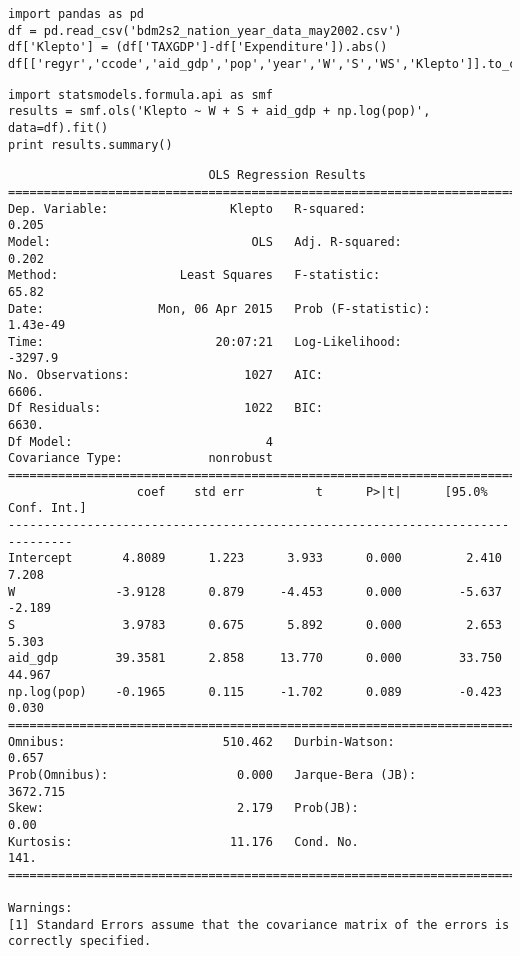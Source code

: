\documentclass[12pt,fleqn]{article}\usepackage{common}
\begin{document}
\begin{verbatim}
import pandas as pd
df = pd.read_csv('bdm2s2_nation_year_data_may2002.csv')
df['Klepto'] = (df['TAXGDP']-df['Expenditure']).abs()
df[['regyr','ccode','aid_gdp','pop','year','W','S','WS','Klepto']].to_csv('/tmp/out.csv')
\end{verbatim}

\begin{verbatim}
import statsmodels.formula.api as smf
results = smf.ols('Klepto ~ W + S + aid_gdp + np.log(pop)', data=df).fit()
print results.summary()
\end{verbatim}

\begin{verbatim}
                            OLS Regression Results                            
==============================================================================
Dep. Variable:                 Klepto   R-squared:                       0.205
Model:                            OLS   Adj. R-squared:                  0.202
Method:                 Least Squares   F-statistic:                     65.82
Date:                Mon, 06 Apr 2015   Prob (F-statistic):           1.43e-49
Time:                        20:07:21   Log-Likelihood:                -3297.9
No. Observations:                1027   AIC:                             6606.
Df Residuals:                    1022   BIC:                             6630.
Df Model:                           4                                         
Covariance Type:            nonrobust                                         
===============================================================================
                  coef    std err          t      P>|t|      [95.0% Conf. Int.]
-------------------------------------------------------------------------------
Intercept       4.8089      1.223      3.933      0.000         2.410     7.208
W              -3.9128      0.879     -4.453      0.000        -5.637    -2.189
S               3.9783      0.675      5.892      0.000         2.653     5.303
aid_gdp        39.3581      2.858     13.770      0.000        33.750    44.967
np.log(pop)    -0.1965      0.115     -1.702      0.089        -0.423     0.030
==============================================================================
Omnibus:                      510.462   Durbin-Watson:                   0.657
Prob(Omnibus):                  0.000   Jarque-Bera (JB):             3672.715
Skew:                           2.179   Prob(JB):                         0.00
Kurtosis:                      11.176   Cond. No.                         141.
==============================================================================

Warnings:
[1] Standard Errors assume that the covariance matrix of the errors is correctly specified.
\end{verbatim}
\end{document}
